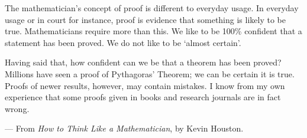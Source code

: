 The mathematician’s concept of proof is different to everyday usage. In everyday usage
or in court for instance, proof is evidence that something is likely to be true. Mathematicians
require more than this. We like to be 100\% confident that a statement has been proved.
We do not like to be ‘almost certain’.

Having said that, how confident can we be that a theorem has been proved? Millions
have seen a proof of Pythagoras’ Theorem; we can be certain it is true. Proofs of newer
results, however, may contain mistakes. I know from my own experience that some proofs
given in books and research journals are in fact wrong.

\begin{flushright}
  --- From \textit{How to Think Like a Mathematician}, by Kevin Houston.
\end{flushright}

